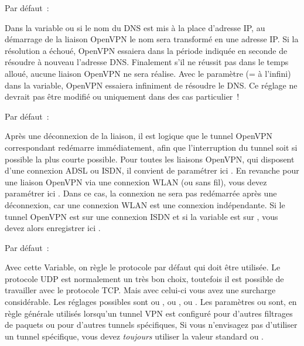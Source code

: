 \begin{description}

  Par défaut~: 

  Dans la variable  ou 
  si le nom du DNS est mis à la place d'adresse IP, au démarrage de la liaison OpenVPN
  le nom sera transformé en une adresse IP. Si la résolution a échoué, OpenVPN
  essaiera dans la période indiquée en seconde de résoudre à nouveau l'adresse DNS.
  Finalement s'il ne réussit pas dans le temps alloué, aucune liaison OpenVPN ne
  sera réalise. Avec le paramètre  (= à l'infini) dans la variable,
  OpenVPN essaiera infiniment de résoudre le DNS. Ce réglage ne devrait pas être
  modifié ou uniquement dans des cas particulier~!


  Par défaut~: 

  Après une déconnexion de la liaison, il est logique que le tunnel OpenVPN
  correspondant redémarre immédiatement, afin que l'interruption du tunnel soit si
  possible la plus courte possible. Pour toutes les liaisons OpenVPN, qui disposent
  d'une connexion ADSL ou ISDN, il convient de paramétrer ici .
  En revanche pour une liaison OpenVPN via une connexion WLAN (ou sans fil), vous
  devez paramétrer ici . Dans ce cas, la connexion ne sera pas
  redémarrée après une déconnexion, car une connexion WLAN est une connexion indépendante.
  Si le tunnel OpenVPN est sur une connexion ISDN et si la variable est sur
  , vous devez alors enregistrer ici .


  Par défaut~: 

  Avec cette Variable, on règle le protocole par défaut qui doit être utilisée.
  Le protocole UDP est normalement un très bon choix, toutefois il est possible
  de travailler avec le protocole TCP. Mais avec celui-ci vous avez une surcharge
  considérable. Les réglages possibles sont  ou ,
   ou ,  ou .
  Les paramètres  ou  
  sont, en règle générale utilisés lorsqu'un tunnel VPN est configuré pour
  d'autres filtrages de paquets ou pour d'autres tunnels spécifiques, Si vous
  n'envisagez pas d'utiliser un tunnel spécifique, vous devez \emph{toujours}
  utiliser la valeur standard  ou .


\end{description}
